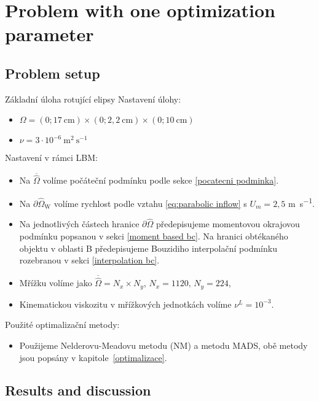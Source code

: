 \section{Problem with one optimization parameter}

\subsection{Problem setup}

\begin{uloha}{Základní úloha rotující elipsy}
	\vspace{2mm}
	Nastavení úlohy:
	\begin{itemize}
		\item $ \Omega=(0 ; 17 \mathrm{~cm}) \times(0 ; 2{,}2 \mathrm{~cm}) \times(0 ; 10 \mathrm{~cm})$
		\item $ \nu=3 \cdot 10^{-6} \mathrm{~m}^{2} \mathrm{~s}^{-1}$
	\end{itemize} 
	Nastavení v rámci LBM:
	\begin{itemize}
		\item Na $ \overline{\hat{\Omega}} $ volíme počáteční podmínku podle sekce \ref{pocatecni podminka}.
		\item Na $ \partial \hat{\Omega}_{\mathrm{W}} $ volíme rychlost podle vztahu \eqref{eq:parabolic inflow} s $ U_m = 2{,}5 $ \si{m s^{-1}}.
		\item Na jednotlivých částech hranice $ \partial \hat{\Omega}$ předepisujeme momentovou okrajovou podmínku popsanou v sekci \ref{moment based bc}. Na hranici obtékaného objektu v oblasti B předepisujeme Bouzidiho interpolační podmínku rozebranou v sekci \ref{interpolation bc}.
		\item Mřížku volíme jako $\overline{\hat{\Omega}} = N_{x} \times N_{y}$, $N_{x} = 1120, \, N_{y} = 224$,
		\item Kinematickou viskozitu v mřížkových jednotkách volíme $\nu^{L} = 10^{-3} $.
	\end{itemize}
	Použité optimalizační metody:
	\begin{itemize}
		\item Použijeme Nelderovu-Meadovu metodu (NM) a metodu MADS, obě metody jsou popsány v kapitole~\ref{optimalizace}.
	\end{itemize}
	\label{ulo:1}
\end{uloha}


\subsection{Results and discussion}